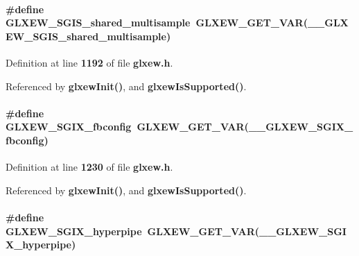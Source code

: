 \paragraph[{G\+L\+X\+E\+W\+\_\+\+S\+G\+I\+S\+\_\+shared\+\_\+multisample}]{\setlength{\rightskip}{0pt plus 5cm}\#define G\+L\+X\+E\+W\+\_\+\+S\+G\+I\+S\+\_\+shared\+\_\+multisample~{\bf G\+L\+X\+E\+W\+\_\+\+G\+E\+T\+\_\+\+V\+AR}({\bf \+\_\+\+\_\+\+G\+L\+X\+E\+W\+\_\+\+S\+G\+I\+S\+\_\+shared\+\_\+multisample})}\label{glxew_8h_aae3937f0701d407617d2d21063b57590}


Definition at line {\bf 1192} of file {\bf glxew.\+h}.



Referenced by {\bf glxew\+Init()}, and {\bf glxew\+Is\+Supported()}.

\paragraph[{G\+L\+X\+E\+W\+\_\+\+S\+G\+I\+X\+\_\+fbconfig}]{\setlength{\rightskip}{0pt plus 5cm}\#define G\+L\+X\+E\+W\+\_\+\+S\+G\+I\+X\+\_\+fbconfig~{\bf G\+L\+X\+E\+W\+\_\+\+G\+E\+T\+\_\+\+V\+AR}({\bf \+\_\+\+\_\+\+G\+L\+X\+E\+W\+\_\+\+S\+G\+I\+X\+\_\+fbconfig})}\label{glxew_8h_add23ba6909617ab99b541612493a8e18}


Definition at line {\bf 1230} of file {\bf glxew.\+h}.



Referenced by {\bf glxew\+Init()}, and {\bf glxew\+Is\+Supported()}.

\paragraph[{G\+L\+X\+E\+W\+\_\+\+S\+G\+I\+X\+\_\+hyperpipe}]{\setlength{\rightskip}{0pt plus 5cm}\#define G\+L\+X\+E\+W\+\_\+\+S\+G\+I\+X\+\_\+hyperpipe~{\bf G\+L\+X\+E\+W\+\_\+\+G\+E\+T\+\_\+\+V\+AR}({\bf \+\_\+\+\_\+\+G\+L\+X\+E\+W\+\_\+\+S\+G\+I\+X\+\_\+hyperpipe})}\label{glxew_8h_a68371d964379b25f5488f5533a0ab0af}


